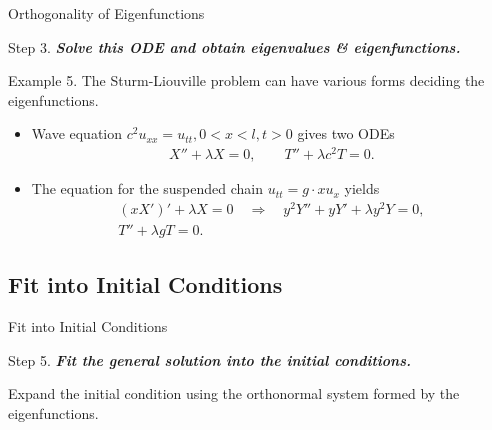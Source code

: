 \documentclass[hyperref={pdfpagelabels=true}]{beamer}
\newcommand{\highlightg}[1]{\textcolor[rgb]{0.1,0.5,0.3}{\emph{\textbf{#1}}}}
\newcommand{\structb}[1]{\textcolor[rgb]{0.2,0.2,0.7}{#1}}
\begin{document}
\begin{frame}{Orthogonality of Eigenfunctions}

\begin{block}{}
	\justifying
	\structb{Step 3.} \highlightg{Solve this ODE and obtain eigenvalues \& eigenfunctions.}
\end{block}
\begin{block}{}
	\justifying
	\structb{Example 5.} The Sturm-Liouville problem can have various forms deciding the eigenfunctions.
	\begin{itemize}
		\item Wave equation $c^2 u_{xx} = u_{tt}, 0 < x < l, t > 0$ gives two ODEs
		\begin{align*}
		X'' + \lambda X = 0,\qquad T'' + \lambda c^2 T = 0.
		\end{align*}
		\item The equation for the suspended chain $u_{tt} = g\cdot xu_x$ yields
		\begin{align*}
		(xX')' + \lambda X = 0\quad\Rightarrow \quad y^2Y'' + yY' + \lambda y^2Y = 0, \\
		T'' + \lambda gT = 0.
		\end{align*}
	\end{itemize}
\end{block}


\end{frame}





\subsection{Fit into Initial Conditions}

\begin{frame}{Fit into Initial Conditions}

\begin{block}{}
	\justifying
	\structb{Step 5.} \highlightg{Fit the general solution into the initial conditions.}
\end{block}

\begin{block}{}
	\justifying
	Expand the initial condition using the orthonormal system formed by the eigenfunctions.
\end{block}




\end{frame}
\end{document}
